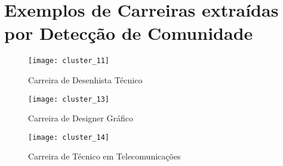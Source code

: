 \documentclass[10pt,a4paper,final]{article}
\begin{document}
\newpage

\def\refname{REFERÊNCIAS BIBLIOGRÁFICAS}



\newpage

\appendix

\section{Exemplos de Carreiras extraídas por Detecção de Comunidade} \label{apx:exemplo-de-carreiras}

\vspace{2\baselineskip}

\begin{figure}[h]
  \centering
  \texttt{[image: cluster\_11]}
  \caption{Carreira de Desenhista Técnico}
\end{figure}

\begin{figure}[h]
  \centering
  \texttt{[image: cluster\_13]}
  \caption{Carreira de Designer Gráfico}
\end{figure}

\begin{figure}[h]
  \centering
  \texttt{[image: cluster\_14]}
  \caption{Carreira de Técnico em Telecomunicações}
\end{figure}
\end{document}
